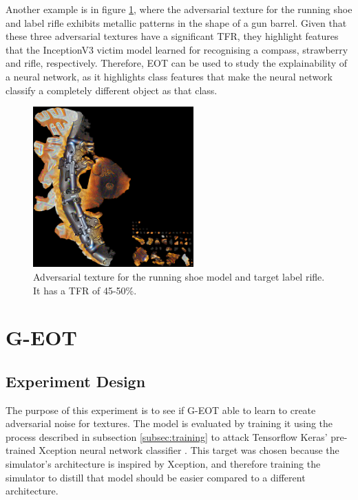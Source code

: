 Another example is in figure \ref{fig:running_shoe_rifle}, where the adversarial texture for the running shoe and label rifle exhibits metallic patterns in the shape of a gun barrel. Given that these three adversarial textures have a significant TFR, they highlight features that the InceptionV3 victim model learned for recognising a compass, strawberry and rifle, respectively. Therefore, EOT can be used to study the explainability of a neural network, as it highlights class features that make the neural network classify a completely different object as that class.

\begin{figure}[H]
    \centering
    \includegraphics[width=0.55\textwidth]{graphics/running shoe rifle.jpg}
    \caption{Adversarial texture for the running shoe model and target label rifle. It has a TFR of 45-50\%.}
    \label{fig:running_shoe_rifle}
\end{figure}

\section{G-EOT}

\subsection{Experiment Design}

The purpose of this experiment is to see if G-EOT able to learn to create adversarial noise for textures. The model is evaluated by training it using the process described in subsection \ref{subsec:training} to attack Tensorflow Keras' pre-trained Xception neural network classifier \cite{xception}. This target was chosen because the simulator's architecture is inspired by Xception, and therefore training the simulator to distill that model should be easier compared to a different architecture.

